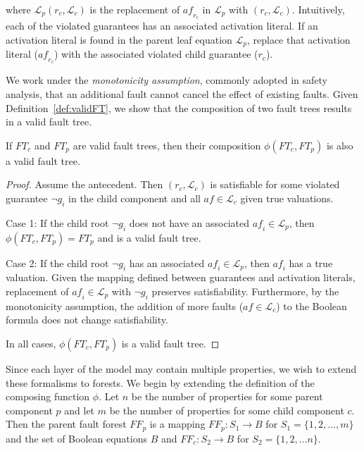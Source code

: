 where $\mathcal{L}_p(r_c, \mathcal{L}_c)$ is the replacement of $\mathit{af_{r_c}}$ in $\mathcal{L}_p$ with $(r_c, \mathcal{L}_c)$. Intuitively, each of the violated guarantees has an associated activation literal. If an activation literal is found in the parent leaf equation $\mathcal{L}_p$, replace that activation literal ($\mathit{af_{r_c}}$) with the associated violated child guarantee ($\mathit{r_c}$). 

We work under the {\em monotonicity assumption}, commonly adopted in safety analysis, that an additional fault cannot cancel the effect of existing faults. Given Definition~\ref{def:validFT}, we show that the composition of two fault trees results in a valid fault tree. 

\begin{lemma} If $\mathit{FT}_c$ and $\mathit{FT}_p$ are valid fault trees, then their composition $\phi(\mathit{FT}_c, \mathit{FT}_p)$ is also a valid fault tree. 
\begin{proof}
Assume the antecedent. Then $(r_c, \mathcal{L}_c)$ is satisfiable for some violated guarantee $\neg g_i$ in the child component and all $\mathit{af} \in \mathcal{L}_c$ given true valuations. 

Case 1: If the child root $\neg g_i$ does not have an associated $\mathit{af_i} \in \mathcal{L}_p$, then $\phi(\mathit{FT}_c, \mathit{FT}_p) = \mathit{FT}_p$ and is a valid fault tree.

Case 2: If the child root $\neg g_i$ has an associated $\mathit{af_i} \in \mathcal{L}_p$, then $\mathit{af_i}$ has a true valuation. Given the mapping defined between guarantees and activation literals, replacement of $\mathit{af_i} \in \mathcal{L}_p$ with $\neg g_i$ preserves satisfiability. Furthermore, by the monotonicity assumption, the addition of more faults ($\mathit{af} \in \mathcal{L}_c$) to the Boolean formula does not change satisfiability. 

In all cases, $\phi(\mathit{FT}_c, \mathit{FT}_p)$ is a valid fault tree. 
\end{proof}
\label{lemma:validTree}
\end{lemma}

Since each layer of the model may contain multiple properties, we wish to extend these formalisms to forests. We begin by extending the definition of the composing function $\phi$. Let $n$ be the number of properties for some parent component $p$ and let $m$ be the number of properties for some child component $c$. Then the parent fault forest $\mathit{FF}_p$ is a mapping $\mathit{FF}_p : S_1 \rightarrow B$ for $S_1 = \{1,2,\dots,m\}$ and the set of Boolean equations $B$ and $\mathit{FF}_c: S_2 \rightarrow B$ for $S_2 = \{1,2,\dots n\}$. 

